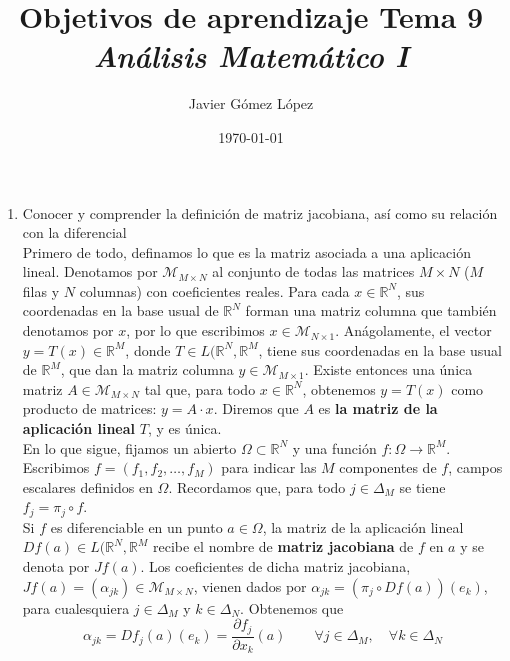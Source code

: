 \documentclass[a4paper, 12pt]{article}
\title{\textbf{Objetivos de aprendizaje Tema 9} \\ \textit{Análisis Matemático I}}
\author{Javier Gómez López}
\date{\today}
\begin{document}
\maketitle

\begin{enumerate}[label=\textbf{\arabic*}.]

\item Conocer y comprender la definición de matriz jacobiana, así como su relación con la diferencial \\

Primero de todo, definamos lo que es la matriz asociada a una aplicación lineal. Denotamos por \(\mathcal{M}_{M \times N}\) al conjunto de todas las matrices \(M \times N\) (\(M\) filas y \(N\) columnas) con coeficientes reales. Para cada \(x \in \mathbb{R}^N\), sus coordenadas en la base usual de \(\mathbb{R}^N\) forman una matriz columna que también denotamos por \(x\), por lo que escribimos \(x \in \mathcal{M}_{N \times 1}\). Anágolamente, el vector \(y = T(x) \in \mathbb{R}^M\), donde \(T \in L(\mathbb{R}^N, \mathbb{R}^M\), tiene sus coordenadas en la base usual de \(\mathbb{R}^M\), que dan la matriz columna \(y \in \mathcal{M}_{M \times 1}\). Existe entonces una única matriz \(A \in \mathcal{M}_{M \times N}\) tal que, para todo \(x \in \mathbb{R}^N\), obtenemos \(y = T(x)\) como producto de matrices: \(y = A \cdot x\). Diremos que \(A\) es \textbf{la matriz de la aplicación lineal} \(T\), y es única. \\

En lo que sigue, fijamos un abierto \(\Omega \subset \mathbb{R}^N\) y una función \(f: \Omega \to \mathbb{R}^M\). Escribimos \(f =  (f_1, f_2, \dotsc, f_M)\) para indicar las \(M\) componentes de \(f\), campos escalares definidos en \(\Omega\). Recordamos que, para todo \(j \in \Delta_M\) se tiene \(f_j = \pi_j \circ f\). \\

Si \(f\) es diferenciable en un punto \(a \in \Omega\), la matriz de la aplicación lineal \(Df(a) \in L(\mathbb{R}^N, \mathbb{R}^M\) recibe el nombre de \textbf{matriz jacobiana} de \(f\) en \(a\) y se denota por \(Jf(a)\). Los coeficientes de dicha matriz jacobiana, \(Jf(a) = ( \alpha_{jk}) \in \mathcal{M}_{M \times N}\), vienen dados por \(\alpha_{jk} = (\pi_j \circ Df(a))(e_k)\), para cualesquiera \(j \in \Delta_M\) y \(k \in \Delta_N\). Obtenemos que
\[
	\alpha_{jk} = Df_j(a)(e_k) = \frac{\partial f_j}{\partial x_k} (a) \qquad \forall j \in \Delta_M, \quad \forall k \in \Delta_N
\]


\end{enumerate}
\end{document}
